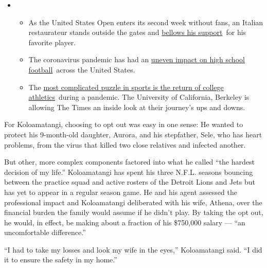 \begin{itemize}
\item
  \begin{itemize}
  \tightlist
  \item
    As the United States Open enters its second week without fans, an
    Italian restaurateur stands outside the gates and
    \href{https://www.nytimes3xbfgragh.onion/2020/09/06/sports/tennis/US-Open-Matteo-Berrettini-fan.html?action=click\&pgtype=Article\&state=default\&region=MAIN_CONTENT_2\&context=storylines_keepup}{bellows
    his support}~for his favorite player.
  \item
    The coronavirus pandemic has had an
    \href{https://www.nytimes3xbfgragh.onion/2020/09/03/sports/ncaafootball/high-school-football-coronavirus-pandemic.html?action=click\&pgtype=Article\&state=default\&region=MAIN_CONTENT_2\&context=storylines_keepup}{uneven
    impact on high school football}~across the United States.
  \item
    The
    \href{https://www.nytimes3xbfgragh.onion/2020/09/02/sports/ncaafootball/coronavirus-cal-athletics-season.html?action=click\&pgtype=Article\&state=default\&region=MAIN_CONTENT_2\&context=storylines_keepup}{most
    complicated puzzle in sports is the return of college
    athletics}~during a pandemic. The University of California, Berkeley
    is allowing The Times an inside look at their journey's ups and
    downs.
  \end{itemize}
\end{itemize}

For Koloamatangi, choosing to opt out was easy in one sense: He wanted
to protect his 9-month-old daughter, Aurora, and his stepfather, Sele,
who has heart problems, from the virus that killed two close relatives
and infected another.

But other, more complex components factored into what he called ``the
hardest decision of my life.'' Koloamatangi has spent his three N.F.L.
seasons bouncing between the practice squad and active rosters of the
Detroit Lions and Jets but has yet to appear in a regular season game.
He and his agent assessed the professional impact and Koloamatangi
deliberated with his wife, Athena, over the financial burden the family
would assume if he didn't play. By taking the opt out, he would, in
effect, be making about a fraction of his \$750,000 salary --- ``an
uncomfortable difference.''

``I had to take my losses and look my wife in the eyes,'' Koloamatangi
said. ``I did it to ensure the safety in my home.''

